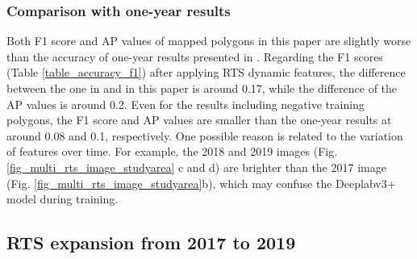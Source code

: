 \documentclass[authoryear,preprint,review,12pt]{elsarticle}
\begin{document}

\subsubsection{Comparison with one-year results}
\label{sec_compare_with_201805_results}

Both F1 score and AP values of mapped polygons in this paper are slightly worse than the accuracy of one-year results presented in \cite{huang2020using}. 
Regarding the F1 scores (Table \ref{table_accuracy_f1}) after applying RTS dynamic features, the difference between the one in \cite{huang2020using} and in this paper is around 0.17, while the difference of the AP values is around 0.2.
Even for the results including negative training polygons, the F1 score and AP values are smaller than the one-year results at around 0.08 and 0.1, respectively. 
One possible reason is related to the variation of features over time. 
For example, the 2018 and 2019 images (Fig. \ref{fig_multi_rts_image_studyarea} c and d) are brighter than the 2017 image (Fig. \ref{fig_multi_rts_image_studyarea}b), which may confuse the Deeplabv3+ model during training. 



\subsection{RTS expansion from 2017 to 2019}
\label{sec_rts_expanding}
\end{document}
